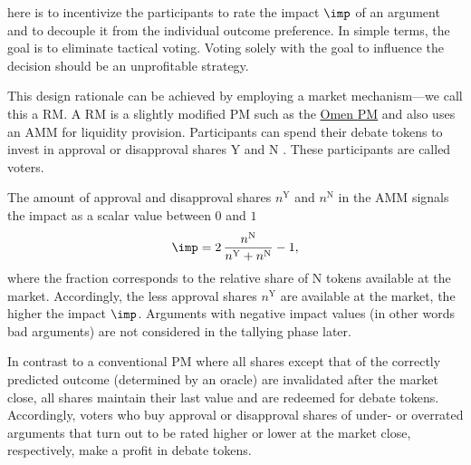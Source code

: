 \documentclass[%
aip,
amsmath,amssymb,
reprint,%
unsortedaddress,
nofootinbib
]{revtex4-2}
\newcommand{\Y}{\text{Y}}
\newcommand{\N}{\text{N}}
\begin{document}
 here is to incentivize the participants to 
rate the impact $\imp$ of an argument and to decouple it from the individual outcome preference. 
In simple terms, the goal is to eliminate tactical voting.
Voting solely with the goal to influence the decision should be an unprofitable strategy.

This design rationale can be achieved by employing a market mechanism---we call this a \ac{RM}.
A \ac{RM} is a slightly modified \ac{PM} such as the \href{https://omen.eth.link/}{Omen \ac{PM}}\cite{Omen2020} and also uses an \ac{AMM}\cite{Zhang2018} for liquidity provision.
Participants can spend their debate tokens to invest in approval or disapproval shares $\Y$ and $\N$
.
These participants are called voters.

The amount of approval and disapproval shares $n^\Y$ and $n^\N$ in the \ac{AMM}
signals the impact as a scalar value between $0$ and $1$
\begin{equation}
	\imp = 2\,\frac{n^\N}{n^\Y+n^\N}-1,
\end{equation}
where the fraction corresponds to the relative share of $\N$ tokens available at the market.
Accordingly, the less approval shares $n^\Y$ are available at the market, the higher the impact $\imp$.
Arguments with negative impact values (in other words bad arguments) are not considered in the tallying phase later.


In contrast to a conventional \ac{PM} where all shares except that of the correctly predicted outcome (determined by an oracle) are invalidated after the market close,
all shares maintain their last value and are redeemed for debate tokens. 
Accordingly, voters who buy approval or disapproval shares of under- or overrated arguments that turn out to be rated higher or lower at the market close, respectively, make a profit in debate tokens.
\end{document}
